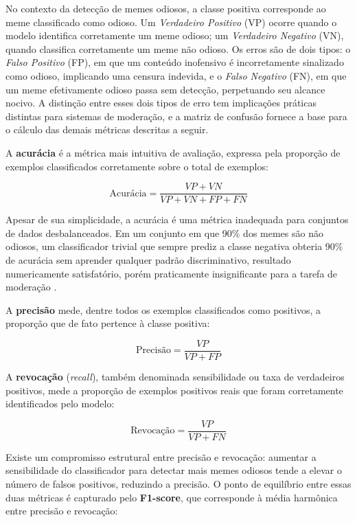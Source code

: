 No contexto da detecção de memes odiosos, a classe positiva corresponde ao meme classificado como odioso. Um \textit{Verdadeiro Positivo} (VP) ocorre quando o modelo identifica corretamente um meme odioso; um \textit{Verdadeiro Negativo} (VN), quando classifica corretamente um meme não odioso. Os erros são de dois tipos: o \textit{Falso Positivo} (FP), em que um conteúdo inofensivo é incorretamente sinalizado como odioso, implicando uma censura indevida, e o \textit{Falso Negativo} (FN), em que um meme efetivamente odioso passa sem detecção, perpetuando seu alcance nocivo. A distinção entre esses dois tipos de erro tem implicações práticas distintas para sistemas de moderação, e a matriz de confusão fornece a base para o cálculo das demais métricas descritas a seguir.

A \textbf{acurácia} é a métrica mais intuitiva de avaliação, expressa pela proporção de exemplos classificados corretamente sobre o total de exemplos:
 
\begin{equation}
\text{Acurácia} = \frac{VP + VN}{VP + VN + FP + FN}
\label{eq:accuracy}
\end{equation}
 
Apesar de sua simplicidade, a acurácia é uma métrica inadequada para conjuntos de dados desbalanceados. Em um conjunto em que 90\% dos memes são não odiosos, um classificador trivial que sempre prediz a classe negativa obteria 90\% de acurácia sem aprender qualquer padrão discriminativo, resultado numericamente satisfatório, porém praticamente insignificante para a tarefa de moderação \cite{he2009}.
 
A \textbf{precisão} mede, dentre todos os exemplos classificados como positivos, a proporção que de fato pertence à classe positiva:
 
\begin{equation}
\text{Precisão} = \frac{VP}{VP + FP}
\label{eq:precision}
\end{equation}
 
A \textbf{revocação} (\textit{recall}), também denominada sensibilidade ou taxa de verdadeiros positivos, mede a proporção de exemplos positivos reais que foram corretamente identificados pelo modelo:
 
\begin{equation}
\text{Revocação} = \frac{VP}{VP + FN}
\label{eq:recall}
\end{equation}
 
Existe um compromisso estrutural entre precisão e revocação: aumentar a sensibilidade do classificador para detectar mais memes odiosos tende a elevar o número de falsos positivos, reduzindo a precisão. O ponto de equilíbrio entre essas duas métricas é capturado pelo \textbf{F1-score}, que corresponde à média harmônica entre precisão e revocação:
 
